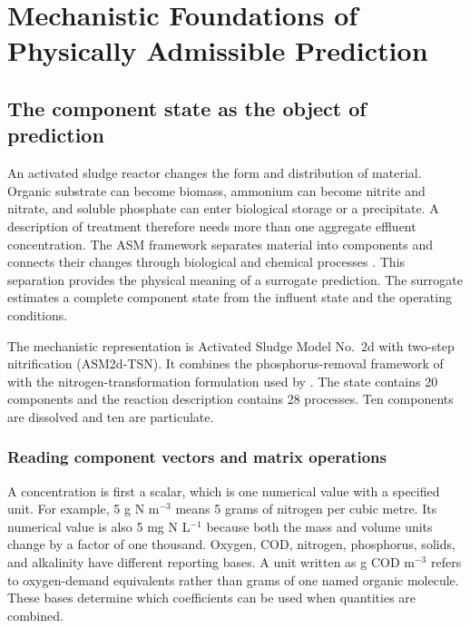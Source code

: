 \chapter{Mechanistic Foundations of Physically Admissible Prediction}
\label{ch:foundations}

\section{The component state as the object of prediction}

An activated sludge reactor changes the form and distribution of material. Organic substrate can become biomass, ammonium can become nitrite and nitrate, and soluble phosphate can enter biological storage or a precipitate. A description of treatment therefore needs more than one aggregate effluent concentration. The ASM framework separates material into components and connects their changes through biological and chemical processes \citep{Henze2006}. This separation provides the physical meaning of a surrogate prediction. The surrogate estimates a complete component state from the influent state and the operating conditions.

The mechanistic representation is Activated Sludge Model No.\ 2d with two-step nitrification (ASM2d-TSN). It combines the phosphorus-removal framework of \citet{Henze2006} with the nitrogen-transformation formulation used by \citet{Guerrero2011}. The state contains 20 components and the reaction description contains 28 processes. Ten components are dissolved and ten are particulate.

\subsection{Reading component vectors and matrix operations}

A concentration is first a scalar, which is one numerical value with a specified unit. For example, 5 g N m$^{-3}$ means 5 grams of nitrogen per cubic metre. Its numerical value is also 5 mg N L$^{-1}$ because both the mass and volume units change by a factor of one thousand. Oxygen, COD, nitrogen, phosphorus, solids, and alkalinity have different reporting bases. A unit written as g COD m$^{-3}$ refers to oxygen-demand equivalents rather than grams of one named organic molecule. These bases determine which coefficients can be used when quantities are combined.

